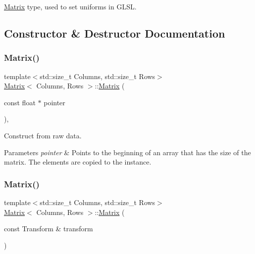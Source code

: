 \hyperlink{struct_matrix}{Matrix} type, used to set uniforms in G\+L\+SL. 

\subsection{Constructor \& Destructor Documentation}
\mbox{\label{struct_matrix_ad40da72f526bcd6854d83496d2f62e01}} 
\subsubsection{\texorpdfstring{Matrix()}{Matrix()}\hspace{0.1cm}{\footnotesize\ttfamily [1/2]}}
{\footnotesize\ttfamily template$<$std\+::size\+\_\+t Columns, std\+::size\+\_\+t Rows$>$ \\
\hyperlink{struct_matrix}{Matrix}$<$ Columns, Rows $>$\+::\hyperlink{struct_matrix}{Matrix} (\begin{DoxyParamCaption}\item[{const float $\ast$}]{pointer }\end{DoxyParamCaption})\hspace{0.3cm}{\ttfamily [inline]}, {\ttfamily [explicit]}}



Construct from raw data. 


\begin{DoxyParams}{Parameters}
{\em pointer} & Points to the beginning of an array that has the size of the matrix. The elements are copied to the instance. \\
\hline
\end{DoxyParams}
\mbox{\label{struct_matrix_acc8ec3ddfe33a01f9ae7970d8fed9855}} 
\subsubsection{\texorpdfstring{Matrix()}{Matrix()}\hspace{0.1cm}{\footnotesize\ttfamily [2/2]}}
{\footnotesize\ttfamily template$<$std\+::size\+\_\+t Columns, std\+::size\+\_\+t Rows$>$ \\
\hyperlink{struct_matrix}{Matrix}$<$ Columns, Rows $>$\+::\hyperlink{struct_matrix}{Matrix} (\begin{DoxyParamCaption}\item[{const Transform \&}]{transform }\end{DoxyParamCaption})\hspace{0.3cm}{\ttfamily [inline]}}



